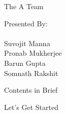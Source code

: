 \documentclass[10pt]{beamer}
\begin{document}
\begingroup
	\begin{frame}[c]{The A Team}
		\begin{center}
			\Huge{Presented By:\\}
			\large{~\\Suvojit Manna\\Pronab Mukherjee\\Barun Gupta\\Somnath Rakshit\\}
		\end{center}
	\end{frame}
	\begin{frame}{Contents in Brief}
		\tableofcontents[hideallsubsections]
	\end{frame}
\endgroup
\begingroup
	\begin{frame}[plain,c]
		\hspace*{10 mm}
		\vspace*{-18 mm}
		\textcolor{blue_light}{\Huge{Let's Get Started}}
	\end{frame}
\endgroup
\end{document}
